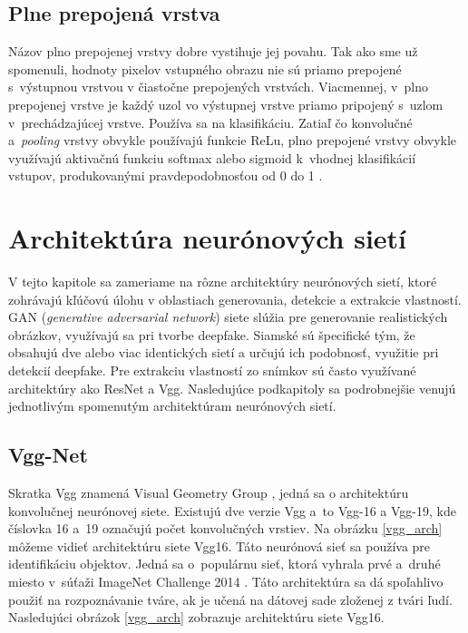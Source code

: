 \subsection{Plne prepojená vrstva}
Názov plno prepojenej vrstvy dobre vystihuje jej povahu. Tak ako sme už spomenuli, hodnoty pixelov vstupného obrazu nie sú priamo prepojené s~výstupnou vrstvou v čiastočne prepojených vrstvách. Viacmennej, v~plno prepojenej vrstve je každý uzol vo výstupnej vrstve priamo pripojený s~uzlom v~prechádzajúcej vrstve. Používa sa na klasifikáciu. Zatiaľ čo konvolučné a~\textit{pooling} vrstvy obvykle používajú funkcie ReLu, plno prepojené vrstvy obvykle využívajú aktivačnú funkciu softmax \cite{softmax} alebo sigmoid k~vhodnej klasifikácií vstupov, produkovanými pravdepodobnosťou od 0 do 1 \cite{IBM_CNN}. 

\section{Architektúra neurónových sietí}

V tejto kapitole sa zameriame na rôzne architektúry neurónových sietí, ktoré zohrávajú kľúčovú úlohu v oblastiach generovania, detekcie a extrakcie vlastností. GAN (\textit{generative adversarial network}) siete slúžia pre generovanie realistických obrázkov, využívajú sa pri tvorbe deepfake. Siamské \cite{siam_doplnok} sú špecifické tým, že obsahujú dve alebo viac identických sietí a určujú ich podobnosť, využitie pri detekcií deepfake. Pre extrakciu vlastností zo snímkov sú často využívané architektúry ako ResNet a Vgg.
Nasledujúce podkapitoly sa podrobnejšie venujú jednotlivým spomenutým architektúram neurónových sietí.

\subsection{Vgg-Net}
Skratka Vgg znamená Visual Geometry Group \cite{vgg-net}, jedná sa o architektúru konvolučnej neurónovej siete. Existujú dve verzie Vgg a~to Vgg-16 a Vgg-19, kde číslovka 16 a~19 označujú počet konvolučných vrstiev. Na obrázku \ref{vgg_arch} môžeme vidieť architektúru siete Vgg16. Táto neurónová sieť sa používa pre identifikáciu objektov. Jedná sa o~populárnu sieť, ktorá vyhrala prvé a~druhé miesto v~súťaži ImageNet Challenge 2014 \cite{vgg-net, simonyan2015deep,imagenet}. Táto architektúra sa dá spoľahlivo použiť na rozpoznávanie tváre, ak je učená na dátovej sade zloženej z tvári ľudí. Nasledujúci obrázok \ref{vgg_arch} zobrazuje architektúru siete Vgg16.

